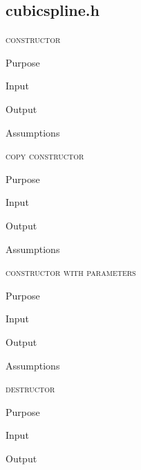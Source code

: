 \documentclass[pdftex, 11pt]{article}
\begin{document}
\subsection{cubicspline.h}

\begin{description}
	\item{\textsc{constructor}}
		\begin{description}
			\item{Purpose}


			\item{Input}


			\item{Output}


			\item{Assumptions}


		\end{description}


	\item{\textsc{copy constructor}}
		\begin{description}
			\item{Purpose}


			\item{Input}


			\item{Output}


			\item{Assumptions}


		\end{description}


	\item{\textsc{constructor with parameters}}
		\begin{description}
			\item{Purpose}


			\item{Input}


			\item{Output}


			\item{Assumptions}


		\end{description}


	\item{\textsc{destructor}}
		\begin{description}
			\item{Purpose}


			\item{Input}


			\item{Output}



\end{description}
\end{description}
\end{document}
